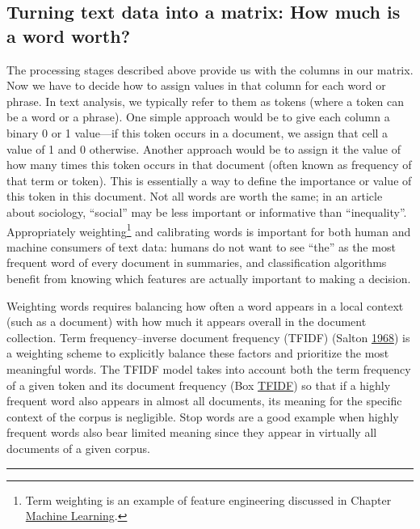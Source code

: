 \documentclass[]{krantz}
\begin{document}
\subsection{Turning text data into a matrix: How much is a word
worth?}\label{turning-text-data-into-a-matrix-how-much-is-a-word-worth}

The processing stages described above provide us with the columns in our
matrix. Now we have to decide how to assign values in that column for
each word or phrase. In text analysis, we typically refer to them as
tokens (where a token can be a word or a phrase). One simple approach
would be to give each column a binary 0 or 1 value---if this token
occurs in a document, we assign that cell a value of 1 and 0 otherwise.
Another approach would be to assign it the value of how many times this
token occurs in that document (often known as frequency of that term or
token). This is essentially a way to define the importance or value of
this token in this document. Not all words are worth the same; in an
article about sociology, ``social'' may be less important or informative
than ``inequality''. Appropriately weighting\footnote{Term weighting is
  an example of feature engineering discussed in Chapter
  \protect\hyperlink{chap:ml}{Machine Learning}.} and calibrating words
is important for both human and machine consumers of text data: humans
do not want to see ``the'' as the most frequent word of every document
in summaries, and classification algorithms benefit from knowing which
features are actually important to making a decision.

Weighting words requires balancing how often a word appears in a local
context (such as a document) with how much it appears overall in the
document collection. Term frequency--inverse document frequency (TFIDF)
(Salton \protect\hyperlink{ref-salton-68}{1968}) is a weighting scheme
to explicitly balance these factors and prioritize the most meaningful
words. The TFIDF model takes into account both the term frequency of a
given token and its document frequency (Box
\protect\hyperlink{box:text1}{TFIDF}) so that if a highly frequent word
also appears in almost all documents, its meaning for the specific
context of the corpus is negligible. Stop words are a good example when
highly frequent words also bear limited meaning since they appear in
virtually all documents of a given corpus.

\begin{center}\rule{0.5\linewidth}{\linethickness}\end{center}
\end{document}
